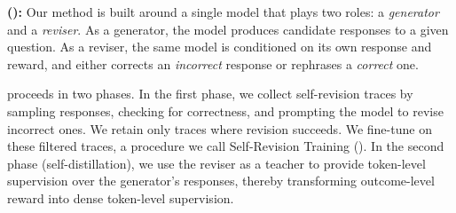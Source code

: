 
 
\textbf{\method{} (\ours{}):}
Our method is built around a single model that plays two roles: a \textit{generator} and a \textit{reviser}. As a generator, the model produces candidate responses to a given question. As a reviser, the same model is conditioned on its own response and reward, and either {corrects} an \emph{incorrect} response or {rephrases} a \emph{correct} one.


\ours{} proceeds in two phases. In the first phase, we collect self-revision traces by sampling responses, checking for correctness, and prompting the model to revise incorrect ones. We retain only traces where revision succeeds. We fine-tune on these filtered traces, a procedure we call Self-Revision Training (\sft{}).
In the second phase (self-distillation), we use the reviser as a teacher to provide token-level supervision over the generator's responses, thereby transforming outcome-level reward into dense token-level supervision.


